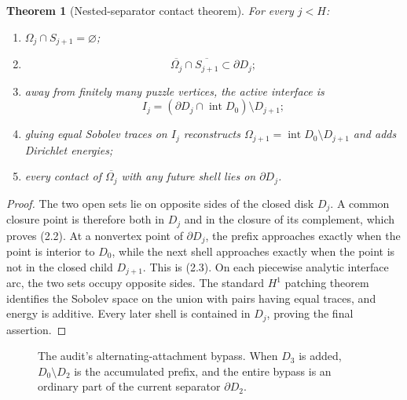 \documentclass[11pt]{article}
\newtheorem{theorem}{Theorem}[section]
\theoremstyle{definition}
\theoremstyle{remark}
\newcommand{\Int}{\operatorname{int}}
\begin{document}
\begin{theorem}[Nested-separator contact theorem]
For every $j<H$:
\begin{enumerate}
\item $\Omega_j\cap S_{j+1}=\varnothing$;
\item
\[
 \overline{\Omega_j}\cap\overline{S_{j+1}}
 \subset\partial D_j;
 \tag{2.2}
\]
\item away from finitely many puzzle vertices, the active interface is
\[
 I_j=(\partial D_j\cap\Int D_0)\setminus D_{j+1};
 \tag{2.3}
\]
\item gluing equal Sobolev traces on $I_j$ reconstructs
$\Omega_{j+1}=\Int D_0\setminus D_{j+1}$ and adds Dirichlet energies;
\item every contact of $\overline{\Omega_j}$ with any future shell lies on
$\partial D_j$.
\end{enumerate}
\end{theorem}

\begin{proof}
The two open sets lie on opposite sides of the closed disk $D_j$.  A common
closure point is therefore both in $D_j$ and in the closure of its complement,
which proves (2.2).  At a nonvertex point of $\partial D_j$, the prefix
approaches exactly when the point is interior to $D_0$, while the next shell
approaches exactly when the point is not in the closed child $D_{j+1}$.  This
is (2.3).  On each piecewise analytic interface arc, the two sets occupy
opposite sides.  The standard $H^1$ patching theorem identifies the Sobolev
space on the union with pairs having equal traces, and energy is additive.
Every later shell is contained in $D_j$, proving the final assertion.
\end{proof}

\begin{figure}[ht]
\centering
{}
\caption{The audit's alternating-attachment bypass.  When $D_3$ is added,
$D_0\setminus D_2$ is the accumulated prefix, and the entire bypass is an
ordinary part of the current separator $\partial D_2$.}
\end{figure}
\end{document}
